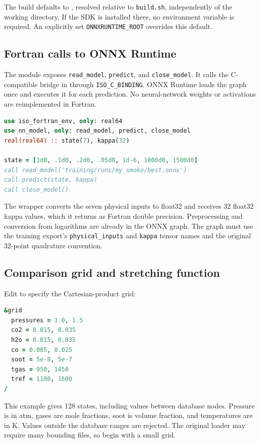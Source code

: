 \documentclass[11pt,letterpaper]{article}
\begin{document}
The build defaults to
, resolved relative to
\texttt{build.sh}, independently of the working directory. If the SDK is
installed there, no environment variable is required. An explicitly set
\texttt{ONNXRUNTIME\_ROOT} overrides this default.

\subsection{Fortran calls to ONNX Runtime}
The module  exposes \texttt{read\_model},
\texttt{predict}, and \texttt{close\_model}. It calls the C-compatible bridge
in  through \texttt{ISO\_C\_BINDING}. ONNX Runtime
loads the graph once and executes it for each prediction. No neural-network
weights or activations are reimplemented in Fortran.
\begin{lstlisting}[language=Fortran]
use iso_fortran_env, only: real64
use nn_model, only: read_model, predict, close_model
real(real64) :: state(7), kappa(32)

state = [1d0, .1d0, .2d0, .05d0, 1d-6, 1000d0, 1500d0]
call read_model('training/runs/my_smoke/best.onnx')
call predict(state, kappa)
call close_model()
\end{lstlisting}
The wrapper converts the seven physical inputs to float32 and receives 32
float32 kappa values, which it returns as Fortran double precision.
Preprocessing and conversion from logarithms are already in the ONNX graph.
The graph must use the training export's \texttt{physical\_inputs} and
\texttt{kappa} tensor names and the original 32-point quadrature convention.

\subsection{Comparison grid and stretching function}
Edit  to specify the Cartesian-product grid:
\begin{lstlisting}[language=Fortran]
&grid
  pressures = 1.0, 1.5
  co2 = 0.015, 0.035
  h2o = 0.015, 0.035
  co = 0.005, 0.025
  soot = 5e-8, 5e-7
  tgas = 950, 1450
  tref = 1100, 1600
/
\end{lstlisting}
This example gives 128 states, including values between database nodes.
Pressure is in atm, gases are mole fractions, soot is volume fraction, and
temperatures are in K. Values outside the database ranges are rejected.
The original loader may require many bounding files, so begin with a small grid.
\end{document}
